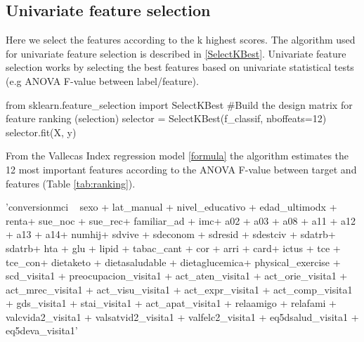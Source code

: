 \documentclass[11pt]{article}
\begin{document}
\subsection{Univariate feature selection}
\label{se:reslinreg}

Here we select the features according to the k highest scores. The algorithm used for univariate feature selection is described in \ref{SelectKBest}. Univariate feature selection works by selecting the best features based on univariate statistical tests (e.g ANOVA F-value between label/feature).

\begin{code}[caption=SelectKBest, label=SelectKBest]
from sklearn.feature_selection import SelectKBest
#Build the design matrix for feature ranking (selection)
selector = SelectKBest(f_classif, nboffeats=12)
selector.fit(X, y)
\end{code}

From the Vallecas Index regression model \ref{formula} the algorithm estimates the 12 most important features according to the ANOVA F-value between target and features (Table \ref{tab:ranking}).

\begin{code}[caption=Regression formula, label=formula]
'conversionmci ~ sexo + lat_manual + nivel_educativo  + edad_ultimodx + renta+ sue_noc + sue_rec+ familiar_ad + imc+ a02 + a03 + a08 + a11 + a12 + a13 + a14+ numhij+ sdvive + sdeconom + sdresid + sdestciv + sdatrb+ sdatrb+ hta + glu + lipid + tabac_cant + cor + arri + card+ ictus + tce + tce_con+ dietaketo + dietasaludable + dietaglucemica+ physical_exercise + scd_visita1 + preocupacion_visita1 + act_aten_visita1 + act_orie_visita1 + act_mrec_visita1 + act_visu_visita1 + act_expr_visita1 + act_comp_visita1 + gds_visita1 + stai_visita1 + act_apat_visita1 + relaamigo + relafami + valcvida2_visita1 + valsatvid2_visita1 + valfelc2_visita1 + eq5dsalud_visita1 + eq5deva_visita1'
\end{code}
\end{document}
